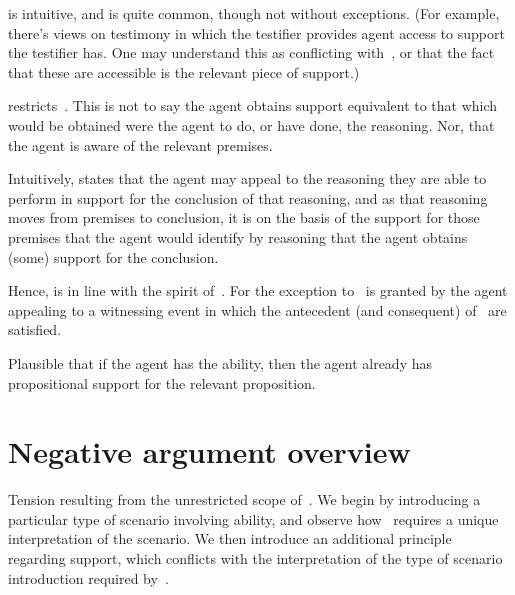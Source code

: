 \begin{note}
  \uRa{} is intuitive, and is quite common, though not without exceptions.
(For example, there's views on testimony in which the testifier provides agent access to support the testifier has.
One may understand this as conflicting with~\uRa{}, or that the fact that these are accessible is the relevant piece of support.)
\end{note}

\begin{note}[Alternative]
  \rC{} restricts~\uRa{}.
  This is not to say the agent obtains support equivalent to that which would be obtained were the agent to do, or have done, the reasoning.
  Nor, that the agent is aware of the relevant premises.

  Intuitively, \rC{} states that the agent may appeal to the reasoning they are able to perform in support for the conclusion of that reasoning, and as that reasoning moves from premises to conclusion, it is on the basis of the support for those premises that the agent would identify by reasoning that the agent obtains (some) support for the conclusion.

  Hence, \rC{} is in line with the spirit of~\bP{}.
  For the exception to~\uRa{} is granted by the agent appealing to a witnessing event in which the antecedent (and consequent) of~\bP{} are satisfied.
\end{note}

\begin{note}
  Plausible that if the agent has the ability, then the agent already has propositional support for the relevant proposition.
\end{note}

\section{Negative argument overview}
\label{sec:broad-argum-overv}

\begin{note}[Overview]
  Tension resulting from the unrestricted scope of~\uRa{}.
  We begin by introducing a particular type of scenario involving ability, and observe how~\uRa{} requires a unique interpretation of the scenario.
  We then introduce an additional principle regarding support, which conflicts with the interpretation of the type of scenario introduction required by~\uRa{}.
\end{note}


